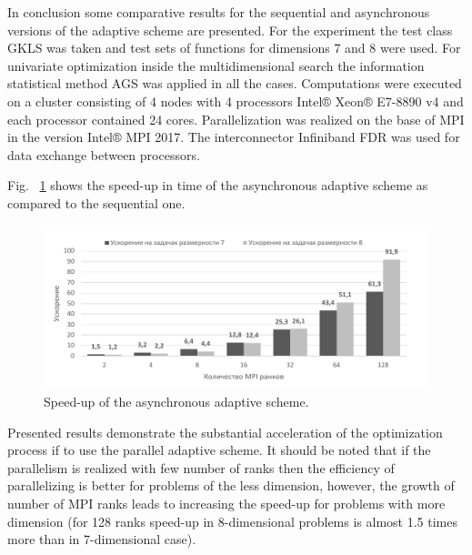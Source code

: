 In conclusion some comparative results for the sequential and asynchronous versions of the adaptive scheme are presented. For the experiment the test class GKLS \cite{5_GavianoKvasovLeraSergeyev} was taken and test sets of functions for dimensions 7 and 8 were used. For univariate optimization inside the multidimensional search the information statistical method AGS was applied in all the cases. Computations were executed on a cluster consisting of 4 nodes with 4 processors Intel® Xeon® E7-8890 v4 and each processor contained 24 cores. Parallelization was realized on the base of MPI in the version Intel® MPI 2017. The interconnector Infiniband FDR was used for data exchange between processors.

Fig. ~\ref{fig:5_12} shows the speed-up in time of the asynchronous adaptive scheme as compared to the sequential one.
\begin{figure}[ht]
\centering
\includegraphics[width=1.05\linewidth]{figures/figure_5_12.pdf}
\caption{Speed-up of the asynchronous adaptive scheme.}
\label{fig:5_12}    
\end{figure}

Presented results demonstrate the substantial acceleration of the optimization process if to use the parallel adaptive scheme. It should be noted that if the parallelism is realized  with  few number of ranks then the efficiency of parallelizing is better for problems of the less dimension, however, the growth of number of MPI ranks leads to increasing the speed-up for  problems with more dimension (for 128 ranks speed-up in 8-dimensional problems is almost 1.5 times more than in 7-dimensional case).

